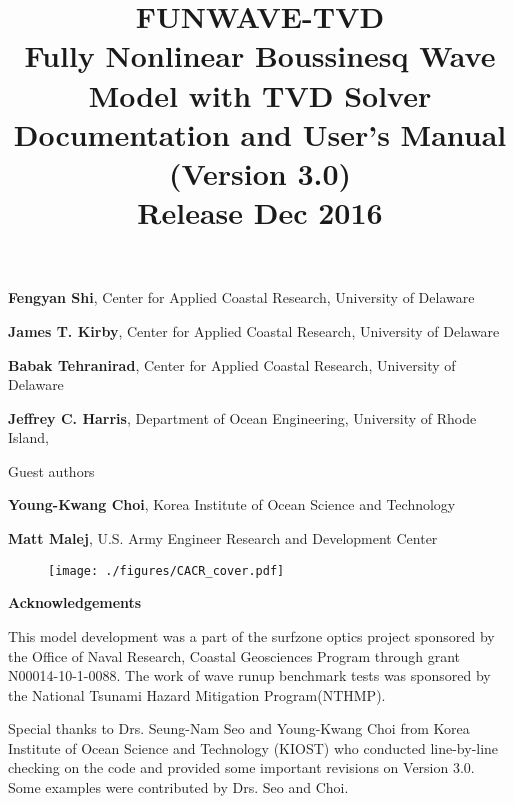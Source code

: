 \documentclass[11pt]{article}
\title{ {\bf \Huge FUNWAVE-TVD}\\
\vspace{1cm}
Fully Nonlinear Boussinesq Wave Model with TVD Solver \\
Documentation and User's Manual \\
{\bf (Version 3.0)} \\ 
Release Dec 2016
}
\date{}
\begin{document}
\maketitle

{\bf Fengyan Shi}, Center for Applied Coastal Research, University of Delaware 

{\bf James T. Kirby}, Center for Applied Coastal Research, University of Delaware

{\bf Babak Tehranirad}, Center for Applied Coastal Research, University of Delaware

{\bf Jeffrey C. Harris},  Department of Ocean Engineering, University of Rhode Island,

\vspace*{0.5cm}
Guest authors

{\bf Young-Kwang Choi}, Korea Institute of Ocean Science and Technology

{\bf Matt Malej},  U.S. Army Engineer Research and Development Center


\vspace*{2.2cm}
     

\begin{figure}[htbp]
\centering
\texttt{[image: ./figures/CACR\_cover.pdf]}
\end{figure}

\thispagestyle{empty}

\newpage
\begin{center}{\bf \Large Acknowledgements}
\end{center}

\vspace*{0.5cm}
  This model development  was a part of the surfzone optics project   sponsored  by  
 the Office of Naval Research, Coastal Geosciences Program through grant N00014-10-1-0088. 
 The work of wave runup benchmark tests 
was sponsored by the National Tsunami Hazard Mitigation Program(NTHMP). 

Special thanks to  Drs. Seung-Nam Seo and Young-Kwang Choi from Korea Institute of Ocean Science and Technology (KIOST) who conducted line-by-line checking on the code and provided some important revisions on Version 3.0. Some examples were contributed by Drs. Seo and Choi. 
\end{document}
